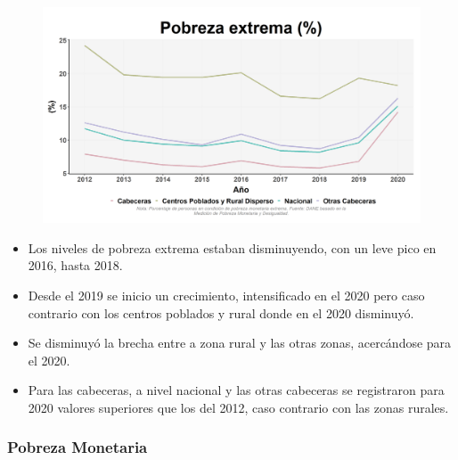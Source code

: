     \begin{figure}[H]
        \caption[Pobreza extrema por zonas y nacional ]{\label{pobreza_extrema_zonas} }
        \begin{center}
        \includegraphics[width=\textwidth,keepaspectratio]{img/var_260_trend.png}
        \end{center}
    \end{figure}
            \begin{itemize}
                    \item Los niveles de pobreza extrema estaban disminuyendo, con un leve pico en 2016, hasta 2018.
                    \item Desde el 2019 se inicio un crecimiento, intensificado en el 2020 pero caso contrario con los centros poblados y rural donde en el 2020 disminuyó.
                    \item Se disminuyó la brecha entre a zona rural y las otras zonas, acercándose para el 2020.
                    \item Para las cabeceras, a nivel nacional y las otras cabeceras se registraron para 2020 valores superiores que los del 2012, caso contrario con las zonas rurales. 
                    \end{itemize}

\subsubsection{Pobreza Monetaria}

